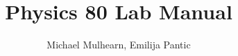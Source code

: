 \documentclass[12pt,oneside]{book}
\theoremstyle{definition}
\begin{document}

\title{Physics 80 Lab Manual}
\author{Michael Mulhearn, Emilija Pantic}
\maketitle

\tableofcontents








\end{document}
